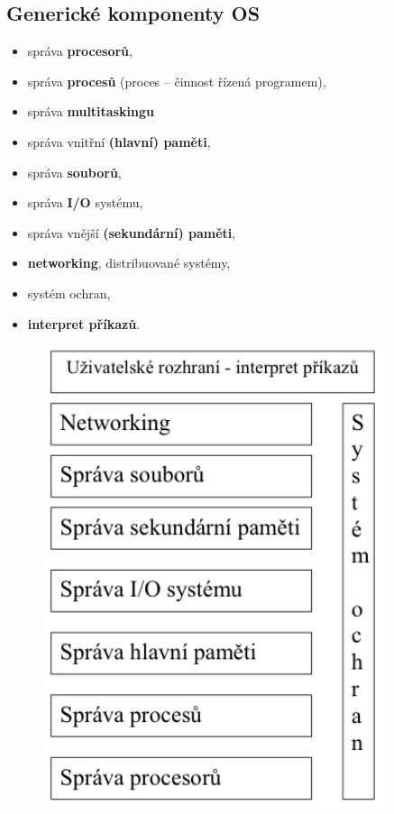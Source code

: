 \subsection{Generické komponenty OS} %
\begin{minipage}[t]{0.6\textwidth}
	\begin{itemize}
		\item správa \textbf{procesorů},
		\item správa \textbf{procesů} (proces – činnost řízená programem),
		\item správa \textbf{multitaskingu}
		\item správa vnitřní \textbf{(hlavní) paměti},
		\item správa \textbf{souborů},
		\item správa \textbf{I/O} systému,
		\item správa vnější \textbf{(sekundární) paměti},
		\item \textbf{networking}, distribuované systémy,
		\item systém ochran,
		\item \textbf{interpret příkazů}.
	\end{itemize}
\end{minipage}
\begin{minipage}[t]{0.38\textwidth}
	\vspace{-10mm}
	\begin{figure}[H]
		\centering
		\includegraphics[width=0.9\textwidth]{assets/3_gen_komp_os}
	\end{figure}
\end{minipage}

